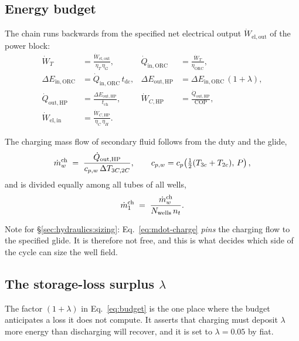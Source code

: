 \subsection{Energy budget}
\label{sec:cycles:budget}

The chain runs backwards from the specified net electrical output
$\dot W_{\mathrm{el,out}}$ of the power block:
\begin{align}
  \dot W_{T} &= \frac{\dot W_{\mathrm{el,out}}}{\eta_{T}\,\eta_{G}}, &
  \dot Q_{\mathrm{in,ORC}} &= \frac{\dot W_{T}}{\eta_{\mathrm{ORC}}},
  \nonumber\\[2pt]
  \Delta E_{\mathrm{in,ORC}} &= \dot Q_{\mathrm{in,ORC}}\, t_{\mathrm{dc}}, &
  \Delta E_{\mathrm{out,HP}} &= \Delta E_{\mathrm{in,ORC}}\,(1+\lambda),
  \nonumber\\[2pt]
  \dot Q_{\mathrm{out,HP}} &= \frac{\Delta E_{\mathrm{out,HP}}}{t_{\mathrm{ch}}}, &
  \dot W_{C,\mathrm{HP}} &= \frac{\dot Q_{\mathrm{out,HP}}}{\mathrm{COP}},
  \nonumber\\[2pt]
  \dot W_{\mathrm{el,in}} &= \frac{\dot W_{C,\mathrm{HP}}}{\eta_{C}\,\eta_{H}}. &&
  \label{eq:budget}
\end{align}

The charging mass flow of secondary fluid follows from the duty and the glide,
\begin{equation}
  \dot m_{w}^{\mathrm{ch}}
  \;=\;
  \frac{\dot Q_{\mathrm{out,HP}}}{c_{p,w}\,\Delta T_{3C,2C}},
  \qquad
  c_{p,w} = c_p\!\left(\tfrac{1}{2}(T_{3c}+T_{2c}),\,P\right),
  \label{eq:mdot-charge}
\end{equation}
and is divided equally among all tubes of all wells,
\begin{equation}
  \dot m_{1}^{\mathrm{ch}} \;=\; \frac{\dot m_{w}^{\mathrm{ch}}}{N_{\mathrm{wells}}\, n_{t}} .
  \label{eq:mdot-per-tube}
\end{equation}

Note for \S\ref{sec:hydraulics:sizing}: Eq.~\eqref{eq:mdot-charge} \emph{pins}
the charging flow to the specified glide. It is therefore not free, and this is
what decides which side of the cycle can size the well field.

\subsection{The storage-loss surplus \texorpdfstring{$\lambda$}{lambda}}
\label{sec:cycles:lambda}

The factor $(1+\lambda)$ in Eq.~\eqref{eq:budget} is the one place where the
budget anticipates a loss it does not compute. It asserts that charging must
deposit $\lambda$ more energy than discharging will recover, and it is set to
$\lambda = 0.05$ by fiat.

